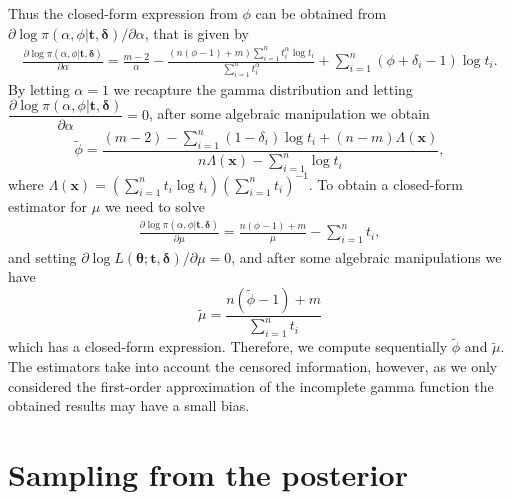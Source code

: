 \documentclass[12pt]{article} %
\newcommand{\bs}{\boldsymbol}
\theoremstyle{plain}%
\theoremstyle{definition}
\theoremstyle{remark}
\begin{document}
Thus the closed-form expression from $\phi$ can be obtained from ${\partial \log \pi(\alpha,\phi|\bs{t,\delta})}{/ \partial \alpha}$, that is given by
\begin{equation*}
\begin{aligned} \frac{\partial \log \pi(\alpha,\phi|\bs{t,\delta})}{\partial \alpha} = \frac{m-2}{\alpha} - \frac{(n(\phi-1)+m)\sum_{i=1}^n t_i^{\alpha}\log t_i}{\sum_{i=1}^n t_i^\alpha} + \sum_{i=1}^n (\phi+\delta_i-1) \log t_i.
\end{aligned}
\end{equation*}
By letting $\alpha=1$ we recapture the gamma distribution and letting $\dfrac{\partial\log \pi(\alpha,\phi|\bs{t,\delta})}{\partial \alpha}=0$, after some algebraic manipulation we obtain
\begin{equation}\label{init1} 
\tilde{\phi} = \frac{(m-2) - \sum_{i=1}^n(1-\delta_i)\log t_i + (n-m)\Lambda(\bs{x}) }{n\Lambda(\bs{x})-\sum_{i=1}^n \log t_i}, 
\end{equation}
where $\Lambda(\bs{x}) = \left(\sum_{i=1}^n t_i\log t_i\right)\left(\sum_{i=1}^n t_i\right)^{-1}$. To obtain a closed-form estimator for $\mu$ we need to solve 
\begin{equation*}
\begin{aligned}
\frac{\partial \log \pi(\alpha,\phi|\bs{t,\delta})}{\partial \mu} = \frac{ n(\phi-1)+m}{\mu} -  \sum_{i=1}^n t_i,
\end{aligned}
\end{equation*}
and setting $\partial \log L(\bs{\theta};\bs{t,\delta}) /\partial \mu=0$, and after some algebraic manipulations we have
\begin{equation}\label{init2}
\tilde{\mu} = \frac{n(\tilde{\phi}-1)+m}{\sum_{i=1}^n t_i}
\end{equation}
which has a closed-form expression. Therefore, we compute sequentially $\tilde{\phi}$ and $\tilde{\mu}$. The estimators take into account the censored information, however, as we only considered the first-order approximation of the incomplete gamma function the obtained results may have a small bias.


\section{Sampling from the posterior}
\end{document}
